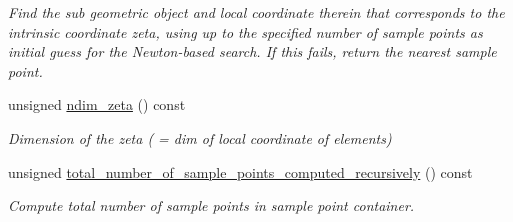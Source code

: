 \begin{DoxyCompactItemize}
\begin{DoxyCompactList}\small\item\em Find the sub geometric object and local coordinate therein that corresponds to the intrinsic coordinate zeta, using up to the specified number of sample points as initial guess for the Newton-\/based search. If this fails, return the nearest sample point. \end{DoxyCompactList}\item 
unsigned \hyperlink{classCGALSamplePointContainer_a0fb2970a09f9fa0e21b04cbf7690a5a2}{ndim\+\_\+zeta} () const
\begin{DoxyCompactList}\small\item\em Dimension of the zeta ( = dim of local coordinate of elements) \end{DoxyCompactList}\item 
unsigned \hyperlink{classCGALSamplePointContainer_ae6d735524cdc0af760e1f096eb12f6c1}{total\+\_\+number\+\_\+of\+\_\+sample\+\_\+points\+\_\+computed\+\_\+recursively} () const
\begin{DoxyCompactList}\small\item\em Compute total number of sample points in sample point container. \end{DoxyCompactList}\end{DoxyCompactItemize}

